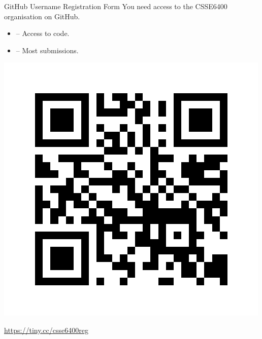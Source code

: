 \documentclass{slide}
\begin{document}
\begin{frame}{GitHub Username Registration Form}
\Large
You need access to the CSSE6400 organisation on GitHub.
\begin{itemize}
    \item {} -- Access to code.
    \item {} -- Most submissions.
\end{itemize}
\vspace{5mm}
\centering
\includegraphics[trim=50 50 50 50,clip,height=0.4\textheight]{images/reg_form_qr.png}

{\color{pine}\url{https://tiny.cc/csse6400reg}}
\end{frame}


\end{document}
